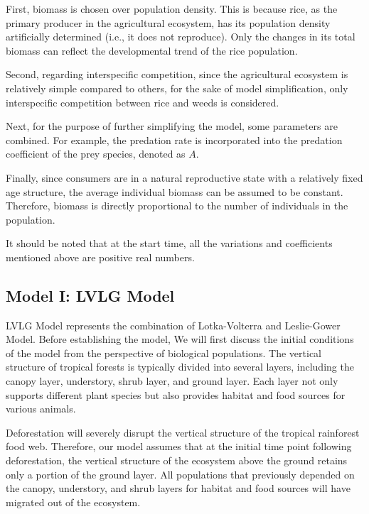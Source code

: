 \documentclass{HZNUMCM}
\begin{document}
        First, biomass is chosen over population density. This is because rice, 
        as the primary producer in the agricultural ecosystem, 
        has its population density artificially determined (i.e., it does not reproduce). 
        Only the changes in its total biomass can reflect the developmental trend of the rice population.
        
        Second, regarding interspecific competition, since the agricultural ecosystem is relatively simple compared to others, 
        for the sake of model simplification, only interspecific competition between rice and weeds is considered. 

        Next, for the purpose of further simplifying the model, some parameters are combined. 
        For example, the predation rate is incorporated into the predation coefficient of the prey species, denoted as \(A\).
        
        Finally, since consumers are in a natural reproductive state with a relatively fixed age structure, 
        the average individual biomass can be assumed to be constant. 
        Therefore, biomass is directly proportional to the number of individuals in the population.
        
        It should be noted that at the start time, all the variations and coefficients mentioned above are positive real numbers.
    \subsection{Model I: LVLG Model}
      LVLG Model represents the combination of Lotka-Volterra and Leslie-Gower Model. 
      Before establishing the model, We will first discuss the initial conditions of the model from the perspective of biological populations. 
      The vertical structure of tropical forests is typically divided into several layers, including the canopy layer, understory, shrub layer, and ground layer. 
      Each layer not only supports different plant species but also provides habitat and food sources for various animals. 
      
      Deforestation will severely disrupt the vertical structure of the tropical rainforest food web. 
      Therefore, our model assumes that at the initial time point following deforestation, 
      the vertical structure of the ecosystem above the ground retains only a portion of the ground layer. 
      All populations that previously depended on the canopy, understory, and shrub layers for habitat and food sources will have migrated out of the ecosystem.
\end{document}

